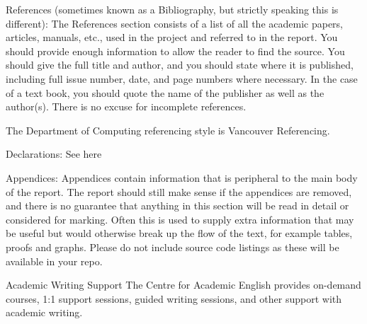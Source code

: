 References (sometimes known as a Bibliography, but strictly speaking this is different): The References section consists of a list of all the academic papers, articles, manuals, etc., used in the project and referred to in the report. You should provide enough information to allow the reader to find the source. You should give the full title and author, and you should state where it is published, including full issue number, date, and page numbers where necessary. In the case of a text book, you should quote the name of the publisher as well as the author(s). There is no excuse for incomplete references.

The Department of Computing referencing style is Vancouver Referencing.

Declarations: See here

Appendices: Appendices contain information that is peripheral to the main body of the report. The report should still make sense if the appendices are removed, and there is no guarantee that anything in this section will be read in detail or considered for marking. Often this is used to supply extra information that may be useful but would otherwise break up the flow of the text, for example tables, proofs and graphs. Please do not include source code listings as these will be available in your repo.

Academic Writing Support
The Centre for Academic English provides on-demand courses, 1:1 support sessions, guided writing sessions, and other support with academic writing.